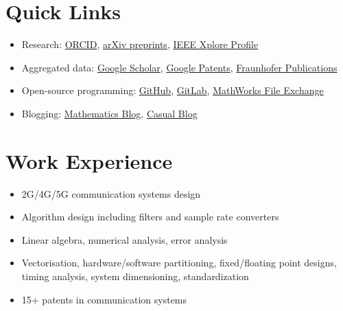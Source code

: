 \documentclass[a4paper,dvipsnames]{report}
\begin{document}
\section*{Quick Links}
\begin{itemize}
	\item Research: \href{https://orcid.org/0000-0001-7186-121X}{ORCID}, \href{https://arxiv.org/a/krishnamoorthy_a_1.html}{arXiv preprints}, \href{https://ieeexplore.ieee.org/author/37086238080}{IEEE Xplore Profile}
	\item Aggregated data: \href{https://scholar.google.com/citations?user=eLf3E1kAAAAJ&hl=en}{Google Scholar}, \href{https://patents.google.com/?inventor=aravindh+krishnamoorthy}{Google Patents}, \href{http://publica.fraunhofer.de/autoren/Krishnamoorthy,%20A}{Fraunhofer Publications}
	\item Open-source programming: \href{https://github.com/aravindh-krishnamoorthy}{GitHub}, \href{https://gitlab.com/aravindh.krishnamoorthy}{GitLab}, \href{https://www.mathworks.com/matlabcentral/profile/authors/3862426}{MathWorks File Exchange}
	\item Blogging: \href{https://aravindh-krishnamoorthy.github.io/ark-math/}{Mathematics Blog}, \href{http://aravindhk.blogspot.com/}{Casual Blog}	
\end{itemize}
\hrulefill
\section*{Work Experience}
\begin{itemize}
	\item 2G/4G/5G communication systems design 
	\item Algorithm design including filters and sample rate converters
	\item Linear algebra, numerical analysis, error analysis
	\item Vectorisation, hardware/software partitioning, fixed/floating point designs, timing analysis, system dimensioning, standardization
	\item 15+ patents in communication systems
\end{itemize}
\hrulefill
\end{document}

